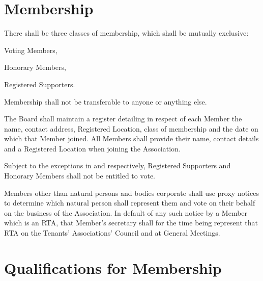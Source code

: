 \documentclass[10pt]{mk-articles-of-association}
\newcommand{\EC}[0]{Board}
\newcommand{\Exec}[0]{\EC{} }
\begin{document}
\section{Membership}
  \begin{constenum}

  \item There shall be three classes of membership, which shall be mutually
    exclusive:
    \begin{constenum}
      \item Voting Members,
      \item Honorary Members, \ITand
      \item Registered Supporters.
    \end{constenum}

  \item Membership shall not be transferable to anyone or anything else.

  \item The \Exec shall maintain a register detailing in respect of
    each Member the name, contact address, Registered Location,
    class of membership and the date on which that Member joined.
    All Members shall provide their name, contact details and a Registered
    Location when joining the Association.

  \item Subject to the exceptions in  and
     respectively, Registered Supporters and
    Honorary Members shall not be entitled to vote.

  \item Members other than natural persons and bodies corporate shall
    use proxy notices to determine which natural person shall
    represent them and vote on their behalf on the business of the
    Association. In default of any such notice by a Member which is an
    RTA, that Member's secretary shall for the time being represent
    that RTA on the Tenants' Associations' Council and at General
    Meetings.

\end{constenum}



\section{Qualifications for Membership}
\end{document}
